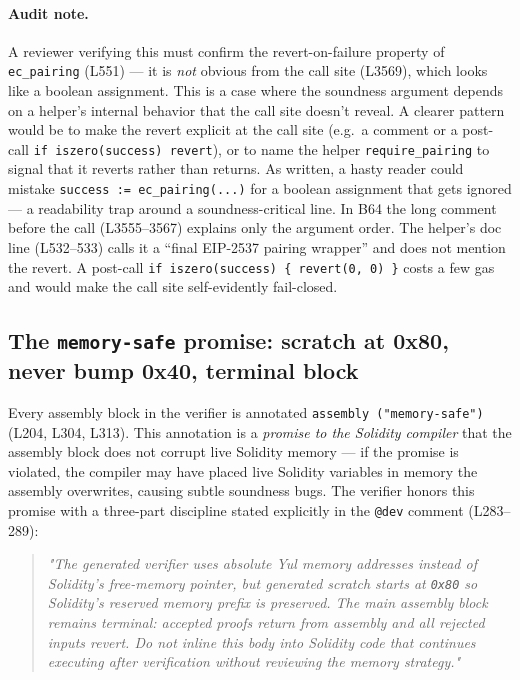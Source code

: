 \paragraph{Audit note.} A reviewer verifying this must confirm the
revert-on-failure property of \texttt{ec\_pairing} (L551) --- it
is \emph{not} obvious from the call site (L3569), which looks like
a boolean assignment. This is a case where the soundness argument
depends on a helper's internal behavior that the call site doesn't
reveal. A clearer pattern would be to make the revert explicit at
the call site (e.g.\ a comment or a post-call
\texttt{if iszero(success) revert}), or to name the helper
\texttt{require\_pairing} to signal that it reverts rather than
returns. As written, a hasty reader could mistake
\texttt{success := ec\_\allowbreak{}pairing(...)} for a boolean assignment that
gets ignored --- a readability trap around a soundness-critical
line.  In B64 the long comment before the call
(L3555--3567) explains only the argument order. The helper's doc line
(L532--533) calls it a ``final EIP-2537 pairing wrapper'' and does
not mention the revert. A post-call
\texttt{if iszero(success) \{ revert(0, 0) \}} costs a few gas and
would make the call site self-evidently fail-closed.

\subsection{The \texttt{memory-safe} promise: scratch at 0x80, never bump 0x40, terminal block}
\label{sec:pr-memorysafe}

Every assembly block in the verifier is annotated
\texttt{assembly ("memory-safe")} (L204, L304, L313). This
annotation is a \emph{promise to the Solidity compiler} that the
assembly block does not corrupt live Solidity memory --- if the
promise is violated, the compiler may have placed live Solidity
variables in memory the assembly overwrites, causing subtle
soundness bugs. The verifier honors this promise with a
three-part discipline stated explicitly in the \texttt{@dev}
comment (L283--289):

\begin{quote}
\emph{"The generated verifier uses absolute Yul memory addresses
instead of Solidity's free-memory pointer, but generated scratch
starts at \texttt{0x80} so Solidity's reserved memory prefix is
preserved. The main assembly block remains terminal: accepted
proofs return from assembly and all rejected inputs revert. Do
not inline this body into Solidity code that continues executing
after verification without reviewing the memory strategy."}
\end{quote}

